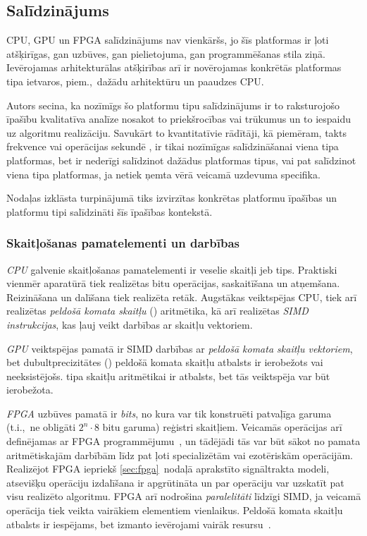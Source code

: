 \subsection{Salīdzinājums} \label{sec:proc-cmp}
CPU, GPU un FPGA salīdzinājums nav vienkāršs, jo šīs platformas ir ļoti
atšķirīgas, gan uzbūves, gan pielietojuma, gan programmēšanas stila ziņā.
Ievērojamas arhitekturālas atšķirības arī ir novērojamas konkrētās
platformas tipa ietvaros, piem.,~dažādu arhitektūru un paaudzes CPU.

Autors secina, ka nozīmīgs šo platformu tipu salīdzinājums ir to
raksturojošo īpašību kvalitatīva analīze nosakot to priekšrocības vai
trūkumus un to iespaidu uz algoritmu realizāciju. Savukārt to
kvantitatīvie rādītāji, kā piemēram, takts frekvence vai operācijas sekundē
, ir tikai nozīmīgas salīdzināšanai viena tipa platformas,
bet ir nederīgi salīdzinot dažādus platformas tipus, vai pat salīdzinot viena tipa
platformas, ja netiek ņemta vērā veicamā uzdevuma specifika.


Nodaļas izklāsta turpinājumā tiks izvirzītas konkrētas platformu īpašības un
platformu tipi salīdzināti šīs īpašības kontekstā.

\subsubsection*{Skaitļošanas pamatelementi un darbības}
\emph{CPU} galvenie skaitļošanas pamatelementi ir veselie skaitļi jeb
 tips. Praktiski vienmēr aparatūrā tiek realizētas
bitu operācijas, saskaitīšana un atņemšana.
Reizināšana un dalīšana tiek realizēta retāk. Augstākas veiktspējas CPU,
tiek arī realizētas \emph{peldošā komata skaitļu} ()
aritmētika, kā arī realizētas \emph{SIMD instrukcijas},
kas ļauj veikt darbības ar skaitļu vektoriem.
\cite{Flynn-arch}\cite{Patterson}\cite{SIMD}

\emph{GPU} veiktspējas pamatā ir SIMD darbības ar \emph{peldošā komata
skaitļu vektoriem}, bet dubultprecizitātes ()
peldošā komata skaitļu atbalsts ir ierobežots vai neeksistējošs.
 tipa skaitļu aritmētikai ir atbalsts, bet tās veiktspēja
var būt ierobežota.
\cite{Fatahalian}\cite{Owens-GPU}

\emph{FPGA} uzbūves pamatā ir \emph{bits}, no kura var tik konstruēti
patvaļīga garuma (t.i.,~ne obligāti $2^n \cdot 8$ bitu garuma) reģistri
 skaitļiem. Veicamās operācijas arī definējamas ar FPGA
programmējumu~\cite{JIS}, un tādējādi tās var būt sākot no pamata aritmētiskajām darbībām
līdz pat ļoti specializētām vai ezotēriskām operācijām. Realizējot FPGA
iepriekš \ref{sec:fpga}~nodaļā aprakstīto signāltrakta modeli, atsevišķu
operāciju izdalīšana ir apgrūtināta un par operāciju var uzskatīt pat visu
realizēto algoritmu. FPGA arī nodrošina \emph{paralelitāti} līdzīgi SIMD, ja
veicamā operācija tiek veikta vairākiem elementiem vienlaikus.
Peldošā komata skaitļu atbalsts ir iespējams, bet izmanto ievērojami vairāk
resursu~\cite{FPGA-fp}.

